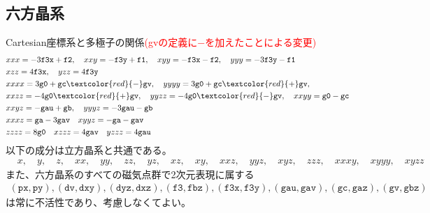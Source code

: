 \documentclass[11pt]{easymemo}
\begin{document}
\subsection{六方晶系}
Cartesian座標系と多極子の関係\textcolor{red}{(gvの定義に$-$を加えたことによる変更)}
\begin{align}
&
xxx= -3 \texttt{f3x} + \texttt{f2},
\quad
xxy= -\texttt{f3y} + \texttt{f1},
\quad
xyy= -\texttt{f3x} - \texttt{f2},
\quad
yyy= -3 \texttt{f3y} - \texttt{f1}
\cr&
xzz= 4 \texttt{f3x},
\quad
yzz= 4 \texttt{f3y}
\cr&
xxxx= 3 \texttt{g0} + \texttt{gc} \textcolor{red}{-} \texttt{gv},
\quad
yyyy= 3 \texttt{g0} + \texttt{gc} \textcolor{red}{+} \texttt{gv},
\cr&
xxzz= -4 \texttt{g0} \textcolor{red}{+} \texttt{gv},
\quad
yyzz= -4 \texttt{g0} \textcolor{red}{-} \texttt{gv},
\quad
xxyy= \texttt{g0} - \texttt{gc}
\cr&
xxyz= -\texttt{gau} + \texttt{gb},
\quad
yyyz= -3 \texttt{gau} - \texttt{gb}
\cr&
xxxz= \texttt{ga} - 3 \texttt{gav}
\quad
xyyz= -\texttt{ga} - \texttt{gav}
\cr&
zzzz= 8 \texttt{g0}
\quad
xzzz= 4 \texttt{gav}
\quad
yzzz= 4 \texttt{gau}
\label{cmprel2}
\end{align}
以下の成分は立方晶系と共通である。
\begin{align}
&
x,
\quad
y,
\quad
z,
\quad
xx,
\quad
yy,
\quad
zz,
\quad
yz,
\quad
xz,
\quad
xy,
\quad
xxz,
\quad
yyz,
\quad
xyz,
\quad
zzz,
\quad
xxxy,
\quad
xyyy,
\quad
xyzz
\end{align}
また、六方晶系のすべての磁気点群で2次元表現に属する
\begin{align}
(\texttt{px},
\texttt{py}),
(\texttt{dv},
\texttt{dxy}),
(\texttt{dyz},
\texttt{dxz}),
(\texttt{f3},
\texttt{fbz}),
(\texttt{f3x},
\texttt{f3y}),
(\texttt{gau},
\texttt{gav}),
(\texttt{gc},
\texttt{gaz}),
(\texttt{gv},
\texttt{gbz})
\end{align}
は常に不活性であり、考慮しなくてよい。
\end{document}

